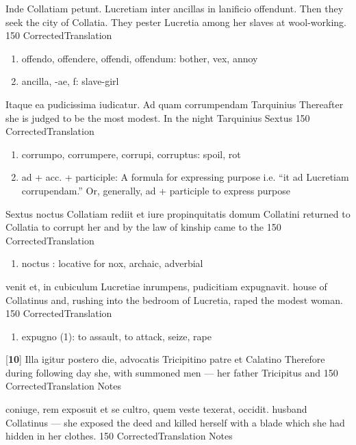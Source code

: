 \latline
  {Inde Collatiam petunt.  Lucretiam inter ancillas in lanificio offendunt.}
  { Then they seek the city of Collatia.  They pester Lucretia among her slaves at wool-working. }
  {150}
  { CorrectedTranslation }
  { \begin{enumerate}
  	\item offendo, offendere, offendi, offendum: bother, vex, annoy
  	\item ancilla, -ae, f:  slave-girl
  \end{enumerate} }


\latline
  {Itaque ea pudicissima iudicatur.  Ad quam corrumpendam Tarquinius}
  { Thereafter she is judged to be the most modest.  In the night Tarquinius Sextus }
  {150}
  { CorrectedTranslation }
  { \begin{enumerate}
  	\item corrumpo, corrumpere, corrupi, corruptus:  spoil, rot
  	\item ad + acc. + participle:  A formula for expressing purpose i.e. ``it ad Lucretiam corrupendam.''  Or, generally, ad + participle to express purpose
  \end{enumerate} }


\latline
  {Sextus noctus Collatiam rediit et iure propinquitatis domum Collatini}
  { returned to Collatia to corrupt her and by the law of kinship came to the }
  {150}
  { CorrectedTranslation }
  { \begin{enumerate}
  	\item noctus : locative for nox, archaic, adverbial
  \end{enumerate} }


\latline
  {venit et, in cubiculum Lucretiae inrumpens, pudicitiam expugnavit.  }
  { house of Collatinus and, rushing into the bedroom of Lucretia, raped the modest woman. }
  {150}
  { CorrectedTranslation }
  { \begin{enumerate}
  	\item expugno (1):  to assault, to attack, seize, rape
  \end{enumerate} }


\latline
  {[\textbf{10}] Illa igitur postero die, advocatis Tricipitino patre et Calatino}
  { Therefore during following day she, with summoned men --- her father Tricipitus and  }
  {150}
  { CorrectedTranslation }
  { Notes }


\latline
  {coniuge, rem exposuit et se cultro, quem veste texerat, occidit.}
  { husband Collatinus --- she exposed the deed and killed herself with a blade which she had hidden in her clothes. }
  {150}
  { CorrectedTranslation }
  { Notes }


